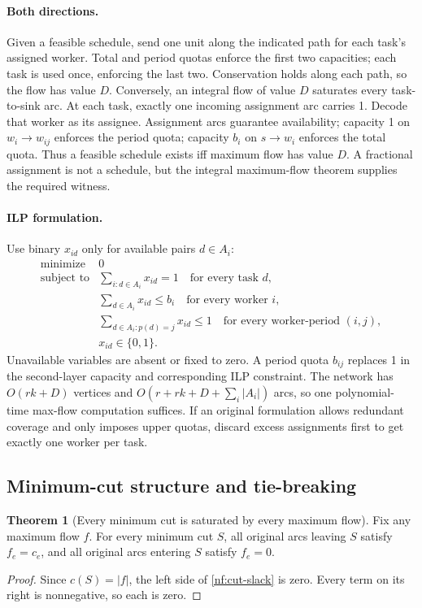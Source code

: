 \documentclass[10pt]{article}
\theoremstyle{definition}
\newtheorem{theorem}[definition]{Theorem}
\begin{document}
\paragraph{Both directions.}
Given a feasible schedule, send one unit along the indicated path for each
task's assigned worker. Total and period quotas enforce the first two
capacities; each task is used once, enforcing the last two. Conservation
holds along each path, so the flow has value $D$.
Conversely, an integral flow of value $D$ saturates every task-to-sink arc.
At each task, exactly one incoming assignment arc carries 1. Decode that
worker as its assignee. Assignment arcs guarantee availability; capacity 1
on $w_i\to w_{ij}$ enforces the period quota; capacity $b_i$ on $s\to w_i$
enforces the total quota. Thus a feasible schedule exists iff maximum flow
has value $D$. A fractional assignment is not a schedule, but the integral
maximum-flow theorem supplies the required witness.

\paragraph{ILP formulation.}
Use binary $x_{id}$ only for available pairs $d\in A_i$:
\[
\begin{array}{rl}
 \text{minimize}&0\\[1mm]
 \text{subject to}&\displaystyle\sum_{i:d\in A_i}x_{id}=1
                    \quad\text{for every task }d,\\[2mm]
 &\displaystyle\sum_{d\in A_i}x_{id}\le b_i
                    \quad\text{for every worker }i,\\[2mm]
 &\displaystyle\sum_{d\in A_i:p(d)=j}x_{id}\le1
                    \quad\text{for every worker-period }(i,j),\\[2mm]
 &x_{id}\in\{0,1\}.
\end{array}
\]
Unavailable variables are absent or fixed to zero. A period quota $b_{ij}$
replaces 1 in the second-layer capacity and corresponding ILP constraint.
The network has $O(rk+D)$ vertices and
$O(r+rk+D+\sum_i|A_i|)$ arcs, so one polynomial-time max-flow computation
suffices. If an original formulation allows redundant coverage and only
imposes upper quotas, discard excess assignments first to get exactly one
worker per task.

\subsection{Minimum-cut structure and tie-breaking}\label{nf:cut-structure}
\begin{theorem}[Every minimum cut is saturated by every maximum flow]
Fix any maximum flow $f$. For every minimum cut $S$, all original arcs
leaving $S$ satisfy $f_e=c_e$, and all original arcs entering $S$ satisfy
$f_e=0$.
\end{theorem}
\begin{proof}
Since $c(S)=|f|$, the left side of \eqref{nf:cut-slack} is zero.
Every term on its right is nonnegative, so each is zero.
\end{proof}
\end{document}
